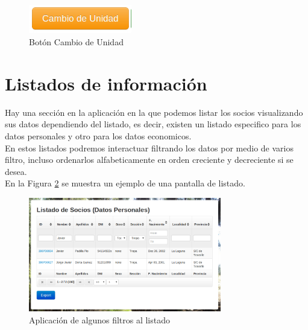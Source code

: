 \begin{figure}[H]
\begin{center}
\includegraphics[width=0.40\textwidth]{images/cambio_unidad.jpg}
\caption{Botón Cambio de Unidad}
\label{fig:cambio_unidad}
\end{center}
\end{figure}

\section{Listados de información}
\label{3:sec4}

Hay una sección en la aplicación en la que podemos listar los socios visualizando sus datos dependiendo del listado, es decir, existen un listado especifico para los datos personales y otro para los datos economicos.\\

En estos listados podremos interactuar filtrando los datos por medio de varios filtro, incluso ordenarlos alfabeticamente en orden creciente y decreciente si se desea.\\

En la Figura \ref{fig:listado} se muestra un ejemplo de una pantalla de listado.

\begin{figure}[H]
\begin{center}
\includegraphics[width=0.75\textwidth]{images/filtrado.jpg}
\caption{Aplicación de algunos filtros al listado}
\label{fig:listado}
\end{center}
\end{figure}


